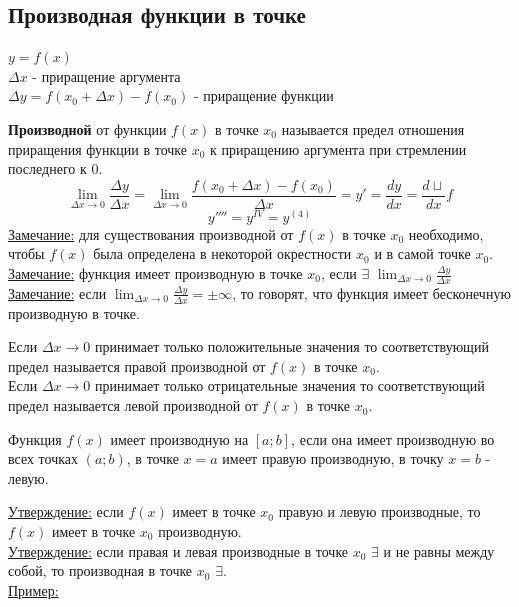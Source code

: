 \documentclass[12pt]{article}
\begin{document}
    \subsection{Производная функции в точке}
    \noindent $y = f(x)$\\
    $\Delta x$ - приращение аргумента\\
    $\Delta y = f(x_0 + \Delta x) - f(x_0)$ - приращение функции\par\noindent
    \textbf{Производной} от функции $f(x)$ в точке $x_0$ называется предел отношения приращения функции в точке $x_0$ к приращению аргумента при стремлении последнего к 0.
    \[ \lim_{\Delta x \to 0} \frac{\Delta y}{\Delta x} = \lim_{\Delta x \to 0} \frac{f(x_0 + \Delta x) - f(x_0)}{\Delta x} = y' = \frac{dy}{dx} = \frac{d\sqcup}{dx}f \]
    \[ y'''' = y^{IV} = y^{(4)}  \]
    \underline{Замечание:} для существования производной от $f(x)$ в точке $x_0$ необходимо, чтобы $f(x)$ была определена в некоторой окрестности $x_0$ и в самой точке $x_0$.\\
    \underline{Замечание:} функция имеет производную в точке $x_0$, если $\exists$ $\lim_{\Delta x \to 0} \frac{\Delta y}{\Delta x}$\\
    \underline{Замечание:} если $\lim_{\Delta x \to 0}\frac{\Delta y}{\Delta x} = \pm \infty$, то говорят, что функция имеет бесконечную производную в точке.\par\noindent
    Если $\Delta x \to 0$ принимает только положительные значения то соответствующий предел называется правой производной от $f(x)$ в точке $x_0$.\\
    Если $\Delta x \to 0$ принимает только отрицательные значения то соответствующий предел называется левой производной от $f(x)$ в точке $x_0$.\par\noindent
    Функция $f(x)$ имеет производную на $[a; b]$, если она имеет производную во всех точках $(a; b)$, в точке $x=a$ имеет правую производную, в точку $x=b$ - левую.\par\noindent
    \underline{Утверждение:} если $f(x)$ имеет в точке $x_0$ правую и левую производные, то $f(x)$ имеет в точке $x_0$ производную.\\
    \underline{Утверждение:} если правая и левая производные в точке $x_0$ $\exists$ и не равны между собой, то производная в точке $x_0$ $\exists$.\\
    \underline{Пример:}
\end{document}
